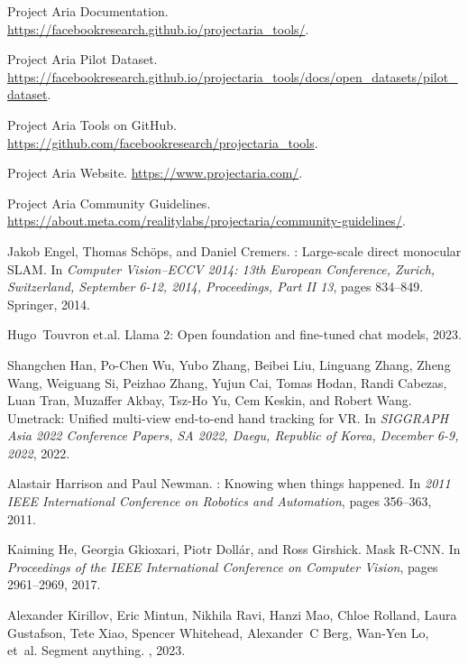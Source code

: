 \documentclass[10pt,twocolumn,letterpaper]{article}
\begin{document}
\begin{thebibliography}{10}

Project {A}ria {D}ocumentation.
\newblock \url{https://facebookresearch.github.io/projectaria_tools/}.

Project {A}ria {P}ilot {D}ataset.
\newblock
  \url{https://facebookresearch.github.io/projectaria_tools/docs/open_datasets/pilot_dataset}.

Project {A}ria {T}ools on {G}it{H}ub.
\newblock \url{https://github.com/facebookresearch/projectaria_tools}.

Project {A}ria {W}ebsite.
\newblock \url{https://www.projectaria.com/}.

Project {A}ria {C}ommunity {G}uidelines.
\newblock
  \url{https://about.meta.com/realitylabs/projectaria/community-guidelines/}.

Jakob Engel, Thomas Sch{\"o}ps, and Daniel Cremers.
: Large-scale direct monocular {SLAM}.
\newblock In {\em Computer Vision--ECCV 2014: 13th European Conference, Zurich,
  Switzerland, September 6-12, 2014, Proceedings, Part II 13}, pages 834--849.
  Springer, 2014.

Hugo~Touvron et.al.
\newblock Llama 2: Open foundation and fine-tuned chat models, 2023.

Shangchen Han, Po{-}Chen Wu, Yubo Zhang, Beibei Liu, Linguang Zhang, Zheng
  Wang, Weiguang Si, Peizhao Zhang, Yujun Cai, Tomas Hodan, Randi Cabezas, Luan
  Tran, Muzaffer Akbay, Tsz{-}Ho Yu, Cem Keskin, and Robert Wang.
\newblock Umetrack: Unified multi-view end-to-end hand tracking for {VR}.
\newblock In {\em {SIGGRAPH} Asia 2022 Conference Papers, {SA} 2022, Daegu,
  Republic of Korea, December 6-9, 2022}, 2022.

Alastair Harrison and Paul Newman.
: Knowing when things happened.
\newblock In {\em 2011 IEEE International Conference on Robotics and
  Automation}, pages 356--363, 2011.

Kaiming He, Georgia Gkioxari, Piotr Doll{\'a}r, and Ross Girshick.
\newblock Mask {R-CNN}.
\newblock In {\em Proceedings of the IEEE International Conference on Computer
  Vision}, pages 2961--2969, 2017.

Alexander Kirillov, Eric Mintun, Nikhila Ravi, Hanzi Mao, Chloe Rolland, Laura
  Gustafson, Tete Xiao, Spencer Whitehead, Alexander~C Berg, Wan-Yen Lo, et~al.
\newblock Segment anything.
, 2023.


\end{thebibliography}
\end{document}
